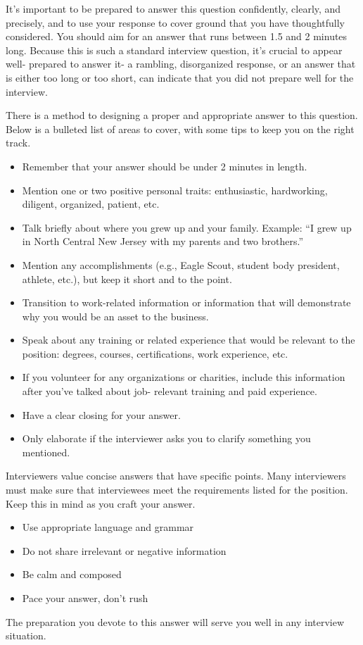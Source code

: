 It's important to be prepared to answer this question confidently, clearly, and precisely, and to use your response to cover ground that you have thoughtfully considered. You should aim for an answer that runs between 1.5 and 2 minutes long. Because this is such a standard interview question, it's crucial to appear well- prepared to answer it-	a rambling, disorganized response, or an answer that is either too long or too short, can indicate that you did not prepare well for the interview.

There is a method to designing a proper and appropriate answer to this question. Below is a bulleted list of areas to cover, with some tips to keep you on the right track.
\begin{itemize}[leftmargin=1.0cm]
	\item Remember that your answer should be under 2 minutes in length.
	\item Mention one or two positive personal traits: enthusiastic, hardworking, diligent, organized, patient, etc.
	\item Talk briefly about where you grew up and your family. Example: ``I grew up in North Central New Jersey with my parents and two brothers.''
	\item Mention any accomplishments (e.g., Eagle Scout, student body president, athlete, etc.), but keep it short and to the point.
	\item Transition to work-related information or information that will demonstrate why you would be an asset to the business.
	\item Speak about any training or related experience that would be relevant to the position: degrees, courses, certifications, work experience, etc.
	\item If you volunteer for any organizations or charities, include this information after you've talked about job- relevant training and paid experience.
	\item Have a clear closing for your answer.
	\item Only elaborate if the interviewer asks you to clarify something you mentioned.
\end{itemize}
Interviewers value concise answers that have specific points. Many interviewers must make sure that interviewees meet the requirements listed for the position. Keep this in mind as you craft your answer.
\begin{itemize}[leftmargin=1.0cm]
	\item Use appropriate language and grammar
	\item Do not share irrelevant or negative information
	\item Be calm and composed
	\item Pace your answer, don't rush
\end{itemize}
The preparation you devote to this answer will serve you well in any interview situation.

